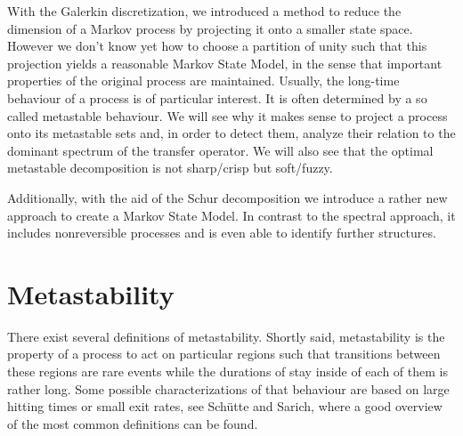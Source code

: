 With the Galerkin discretization, we introduced a method to reduce the dimension of a Markov process by projecting it onto a smaller state space.
However we don't know yet how to choose a partition of unity such that this projection yields a reasonable Markov State Model, in the sense that important properties of the original process are maintained.
Usually, the long-time behaviour of a process is of particular interest. It is often determined by a so called metastable behaviour.
We will see why it makes sense to project a process onto its metastable sets and, in order to detect them, analyze their relation to the dominant spectrum of the transfer operator.
We will also see that the optimal metastable decomposition is not sharp/crisp but soft/fuzzy.

Additionally, with the aid of the Schur decomposition we introduce a rather new approach to create a Markov State Model. In contrast to the spectral approach, it includes nonreversible processes and is even able to identify further structures.


\section{Metastability}
\label{sec:metastability}

There exist several definitions of metastability. %
Shortly said, metastability is the property of a process to act on particular regions such that transitions between these regions are rare events while the durations of stay inside of each of them is rather long.
Some possible characterizations of that behaviour are based on large hitting times or small exit rates, see Sch\"utte and Sarich\cite[chapter 3]{schutte2013metastability},
where a good overview of the most common definitions can be found.

